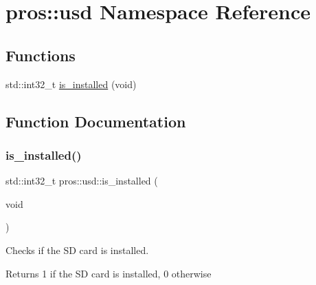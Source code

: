 \hypertarget{namespacepros_1_1usd}{}\section{pros\+:\+:usd Namespace Reference}
\label{namespacepros_1_1usd}
\subsection*{Functions}
\begin{DoxyCompactItemize}
\item 
std\+::int32\+\_\+t \hyperlink{namespacepros_1_1usd_a2d7eecbe50533c0d753e82470dc2e6f3}{is\+\_\+installed} (void)
\end{DoxyCompactItemize}


\subsection{Function Documentation}
\mbox{\label{namespacepros_1_1usd_a2d7eecbe50533c0d753e82470dc2e6f3}} 
\subsubsection{\texorpdfstring{is\+\_\+installed()}{is\_installed()}}
{\footnotesize\ttfamily std\+::int32\+\_\+t pros\+::usd\+::is\+\_\+installed (\begin{DoxyParamCaption}\item[{void}]{ }\end{DoxyParamCaption})}

Checks if the SD card is installed.

\begin{DoxyReturn}{Returns}
1 if the SD card is installed, 0 otherwise 
\end{DoxyReturn}
